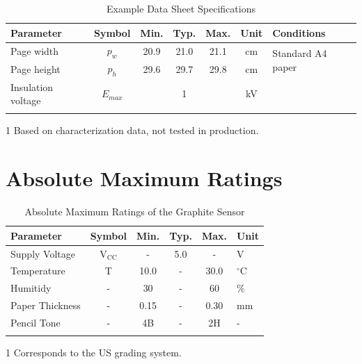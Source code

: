 \documentclass[10pt]{datasheet}
\begin{document}
\begin{table}[h]
\begin{threeparttable}
\caption{Example Data Sheet Specifications}
\begin{tabularx}{\textwidth}{l | c | c c c | c | X}
    \thickhline
    \textbf{Parameter} & \textbf{Symbol} & \textbf{Min.} & \textbf{Typ.} & \textbf{Max.} &
    \textbf{Unit} & \textbf{Conditions} \\
    \hline
    Page width  & $p_w$ & 20.9 & 21.0 & 21.1 & cm & \multirow{2}{*}{Standard A4 paper} \\
    Page height & $p_h$ & 29.6 & 29.7 & 29.8 & cm &  \\
    \hline
    Insulation voltage & $E_{max}$\tnote{1} & & 1 & & kV & \\
    \thickhline
\end{tabularx}
\begin{tablenotes}
\item[1]{Based on characterization data, not tested in production.}
\end{tablenotes}
\end{threeparttable}
\end{table}

\section{Absolute Maximum Ratings}

\begin{table}[h!]
\begin{threeparttable}
\caption{Absolute Maximum Ratings of the Graphite Sensor}
\begin{tabularx}{\textwidth}{l | c | c c c | X}
    \thickhline
    \textbf{Parameter} & \textbf{Symbol} & \textbf{Min.} & \textbf{Typ.} & \textbf{Max.} & \textbf{Unit} \\
    \hline
    Supply Voltage & V$_{\text{CC}}$ & - & 5.0 & - & V \\
    \hline
    Temperature & T & 10.0 & - & 30.0 & $^\circ$C \\
    Humitidy & - & 30 & - & 60 & \% \\
    \hline
    Paper Thickness & - & 0.15 & - & 0.30 & mm \\
    Pencil Tone\tnote{1} & - & 4B & - & 2H & - \\
    \thickhline
\end{tabularx}
\begin{tablenotes}
\item[1]{Corresponds to the US grading system.}
\end{tablenotes}
\end{threeparttable}
\end{table}
\end{document}
